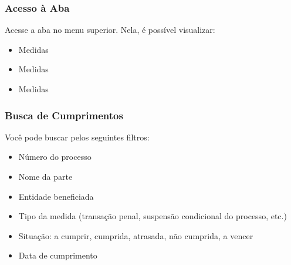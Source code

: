 \documentclass[letterpaper,10pt,brazil]{sphinxmanual}
\begin{document}
\subsubsection{Acesso à Aba}
\label{\detokenize{projud_58_cadastrocumprimentomedida:acesso-a-aba}}
\sphinxAtStartPar
Acesse a aba  no menu superior. Nela, é possível visualizar:
\begin{itemize}
\item {} 
\sphinxAtStartPar
Medidas 

\item {} 
\sphinxAtStartPar
Medidas 

\item {} 
\sphinxAtStartPar
Medidas 

\end{itemize}


\subsubsection{Busca de Cumprimentos}
\label{\detokenize{projud_58_cadastrocumprimentomedida:busca-de-cumprimentos}}
\sphinxAtStartPar
Você pode buscar pelos seguintes filtros:
\begin{itemize}
\item {} 
\sphinxAtStartPar
Número do processo

\item {} 
\sphinxAtStartPar
Nome da parte

\item {} 
\sphinxAtStartPar
Entidade beneficiada

\item {} 
\sphinxAtStartPar
Tipo da medida (transação penal, suspensão condicional do processo, etc.)

\item {} 
\sphinxAtStartPar
Situação: a cumprir, cumprida, atrasada, não cumprida, a vencer

\item {} 
\sphinxAtStartPar
Data de cumprimento

\end{itemize}
\end{document}
